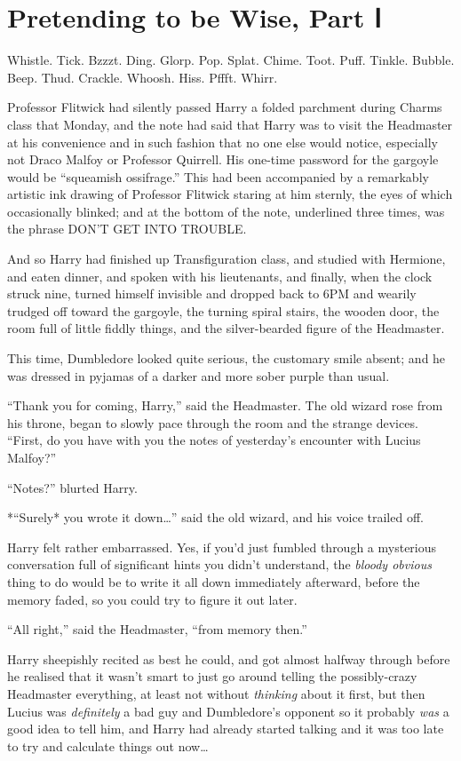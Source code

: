 \chapter{Pretending to be Wise, Part Ⅰ}

Whistle. Tick. Bzzzt. Ding. Glorp. Pop. Splat. Chime. Toot. Puff.
Tinkle. Bubble. Beep. Thud. Crackle. Whoosh. Hiss. Pffft. Whirr.

Professor Flitwick had silently passed Harry a folded parchment during
Charms class that Monday, and the note had said that Harry was to visit
the Headmaster at his convenience and in such fashion that no one else
would notice, especially not Draco Malfoy or Professor Quirrell. His
one-time password for the gargoyle would be ``squeamish ossifrage.''
This had been accompanied by a remarkably artistic ink drawing of
Professor Flitwick staring at him sternly, the eyes of which
occasionally blinked; and at the bottom of the note, underlined three
times, was the phrase DON'T GET INTO TROUBLE.

And so Harry had finished up Transfiguration class, and studied with
Hermione, and eaten dinner, and spoken with his lieutenants, and
finally, when the clock struck nine, turned himself invisible and
dropped back to 6PM and wearily trudged off toward the gargoyle, the
turning spiral stairs, the wooden door, the room full of little fiddly
things, and the silver-bearded figure of the Headmaster.

This time, Dumbledore looked quite serious, the customary smile absent;
and he was dressed in pyjamas of a darker and more sober purple than
usual.

``Thank you for coming, Harry,'' said the Headmaster. The old wizard
rose from his throne, began to slowly pace through the room and the
strange devices. ``First, do you have with you the notes of yesterday's
encounter with Lucius Malfoy?''

``Notes?'' blurted Harry.

*``Surely* you wrote it down\ldots{}'' said the old wizard, and his
voice trailed off.

Harry felt rather embarrassed. Yes, if you'd just fumbled through a
mysterious conversation full of significant hints you didn't understand,
the \emph{bloody obvious} thing to do would be to write it all down
immediately afterward, before the memory faded, so you could try to
figure it out later.

``All right,'' said the Headmaster, ``from memory then.''

Harry sheepishly recited as best he could, and got almost halfway
through before he realised that it wasn't smart to just go around
telling the possibly-crazy Headmaster everything, at least not without
\emph{thinking} about it first, but then Lucius was \emph{definitely} a
bad guy and Dumbledore's opponent so it probably \emph{was} a good idea
to tell him, and Harry had already started talking and it was too late
to try and calculate things out now\ldots{}

